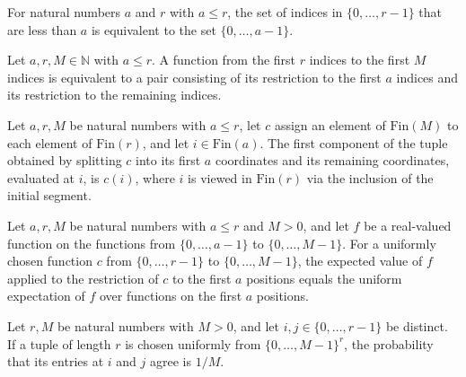 \begin{definition}
\label{FABL.finInitialSegmentEquiv}
\leanok
For natural numbers $a$ and $r$ with $a\le r$, the set of indices in $\{0,\ldots,r-1\}$
that are less than $a$ is equivalent to the set $\{0,\ldots,a-1\}$.
\end{definition}

\begin{definition}
\label{FABL.paddedCloneTupleEquiv}
\leanok
{}
Let $a,r,M\in\mathbb{N}$ with $a\le r$. A function from the first $r$ indices to the
first $M$ indices is equivalent to a pair consisting of its restriction to the first $a$
indices and its restriction to the remaining indices.
\end{definition}

\begin{theorem}
\label{FABL.paddedCloneTupleEquiv_fst_apply}
\leanok
{}
Let $a,r,M$ be natural numbers with $a\le r$, let $c$ assign an element of
$\mathrm{Fin}(M)$ to each element of $\mathrm{Fin}(r)$, and let $i\in\mathrm{Fin}(a)$.
The first component of the tuple obtained by splitting $c$ into its first $a$
coordinates and its remaining coordinates, evaluated at $i$, is $c(i)$, where $i$ is
viewed in $\mathrm{Fin}(r)$ via the inclusion of the initial segment.
\end{theorem}

\begin{theorem}
\label{FABL.uniformPaddedCloneExpectation}
\leanok
{}
Let $a,r,M$ be natural numbers with $a\le r$ and $M>0$, and let $f$ be a real-valued
function on the functions from $\{0,\ldots,a-1\}$ to $\{0,\ldots,M-1\}$. For a uniformly
chosen function $c$ from $\{0,\ldots,r-1\}$ to $\{0,\ldots,M-1\}$, the expected value of
$f$ applied to the restriction of $c$ to the first $a$ positions equals the uniform
expectation of $f$ over functions on the first $a$ positions.
\end{theorem}

\begin{theorem}
\label{FABL.uniformCloneTuple_pair_eq_probability}
\leanok
{}
Let $r,M$ be natural numbers with $M>0$, and let $i,j\in\{0,\ldots,r-1\}$ be distinct. If a tuple of length $r$ is chosen uniformly from $\{0,\ldots,M-1\}^r$, the probability that its entries at $i$ and $j$ agree is $1/M$.
\end{theorem}


